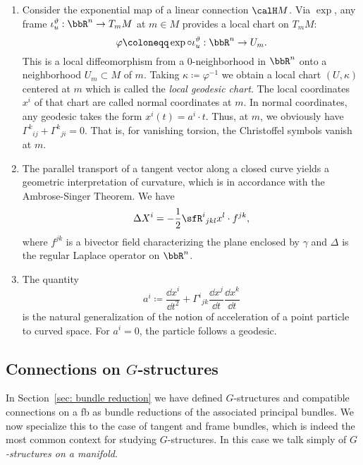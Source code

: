 \begin{rem}\label{rem 2.1.30 RS2}
    \begin{enumerate}
        \item Consider the exponential map of a linear connection $\calH M$. Via $\exp$, any frame $\iota_u^\vartheta:\bbR^n\to T_m M$ at $m\in M$ provides a local chart on $T_mM$:
        \[\varphi\coloneqq \exp\circ \iota_u^\vartheta:\bbR^n\to U_m.\]
        This is a local diffeomorphism from a $0$-neighborhood in $\bbR^n$ onto a  neighborhood $U_m\subset M$ of $m$. Taking $\kappa\coloneqq \varphi^{-1}$ we obtain a local chart $(U,\kappa)$ centered at $m$ which is called the \emph{local geodesic chart}. The local coordinates $x^i$ of that chart are called normal coordinates at $m$. In normal coordinates, any geodesic takes the form $x^i(t)=a^i\cdot t$. Thus, at $m$, we obviously have $\Gamma^k{}_{ij}+\Gamma^k{}_{ji}=0$. That is, for vanishing torsion, the Christoffel symbols vanish at $m$.
        \item The parallel transport of a tangent vector along a closed curve yields a geometric interpretation of curvature, which is in accordance with the Ambrose-Singer Theorem. We have 
        \[\Delta X^i=-\frac12 \sfR^i{}_{jkl}x^l\cdot f^{jk},\]
        where $f^{jk}$ is a bivector field characterizing the plane enclosed by $\gamma$ and $\Delta$ is the regular Laplace operator on $\bbR^n$.
        \item The quantity 
        \[a^i\coloneqq \frac{\dd x^i}{\dd t^2}+\Gamma^i{}_{jk}\frac{\dd x^j}{\dd t}\frac{\dd x^k}{\dd t}\]
        is the natural generalization of the notion of acceleration of a point particle to curved space. For $a^i=0$, the particle follows a geodesic.
    \end{enumerate}
\end{rem}





\subsection{Connections on \texorpdfstring{$G$}{G}-structures}

In Section~\ref{sec: bundle reduction} we have defined $G$-structures and compatible connections on a \gls{fb} as bundle reductions of the associated principal bundles. We now specialize this to the case of tangent and frame bundles, which is indeed the most common context for studying $G$-structures. In this case we talk simply of \emph{$G$-structures on a manifold}.

